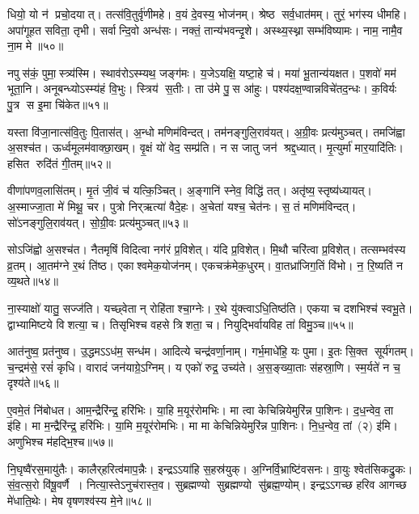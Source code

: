 धियो॒ यो न॑ प्रचो॒दयात्‌। तत्स॑वि॒तुर्वृ॑णीमहे। 
व॒यं दे॒वस्य॒ भोज॑नम्‌। श्रेष्ठ सर्व॒धात॑मम्‌। 
तुरं॒ भग॑स्य धीमहि। अपा॑गूहत सविता॒ तृभी\sn। 
सर्वान्दि॒वो अन्ध॑सः। नक्तं॒ तान्य॑भवन्दृ॒शे। 
अस्थ्य॒स्थ्ना सम्भ॑विष्यामः। नाम॒ नामै॒व ना॒म मे॥५०॥


नपुस॑कं॒ पुमा॒स्त्र्य॑स्मि। स्थाव॑रोऽस्म्यथ॒ जङ्ग॑मः। 
य॒जेऽयक्षि॒ यष्टा॒हे च॑। मया॑ भू॒तान्य॑यक्षत। 
प॒शवो॑ मम॑ भूता॒नि। अनूबन्ध्योऽस्म्य॑हं वि॒भुः। 
स्त्रिय॑ स॒तीः। ता उ॑मे पु॒स आ॑हुः। 
पश्य॑दक्ष॒ण्वान्नविचे॑तद॒न्धः। क॒विर्यः पु॒त्र स इ॒मा चि॑केत॥५१॥


यस्ता वि॑जा॒नात्स॑वि॒तुः पि॒तास॑त्‌। अ॒न्धो मणिम॑विन्दत्‌। 
तम॑नङ्गुलि॒राव॑यत्‌। अ॒ग्री॒वः प्रत्य॑मुञ्चत्‌। 
तमजि॑ह्वा अ॒सश्च॑त। ऊर्ध्वमूलम॑वाक्छा॒खम्‌। 
वृ॒क्षं यो॑ वेद॒ सम्प्र॑ति। न स जातु जन॑ श्रद्द॒ध्यात्‌। 
मृ॒त्युर्मा॑ मार॒यादि॑तिः। हसित रुदि॑तं गी॒तम्‌॥५२॥


वीणा॑पणव॒लासि॑तम्‌। मृ॒तं जी॒वं च॑ यत्कि॒ञ्चित्। 
अ॒ङ्गानि॑ स्नेव॒ विद्धि॑ तत्‌। अतृ॑ष्य॒स्तृष्य॑ध्यायत्‌। 
अ॒स्माज्जा॒ता मे॑ मिथू॒ चर\snn। पुत्रो निर्‌ऋत्या॑ वैदे॒हः। 
अ॒चेता॑ यश्च॒ चेत॑नः। स॒ तं मणिम॑विन्दत्‌। 
सो॑ऽनङ्गुलि॒राव॑यत्‌। सो॒\aav{}ग्री॒वः प्रत्य॑मुञ्चत्‌॥५३॥


सोऽजि॑ह्वो अ॒सश्च॑त। नैतमृषिं विदित्वा नग॑रं प्र॒विशेत्‌। 
य॑दि प्र॒विशेत्‌। मि॒थौ चरि॑त्वा प्र॒विशेत्‌। 
तत्सम्भव॑स्य व्र॒तम्‌। आ॒तम॑ग्ने र॒थं ति॑ष्ठ। 
एकाश्वमेक॒योज॑नम्‌। एकचक्र॑मेक॒धुरम्‌। 
वा॒तध्रा॑जिग॒तिं वि॑भो। न॒ रि॒ष्यति॑ न व्य॒थते॥५४॥


ना॒स्याक्षो॑ यातु॒ सज्ज॑ति। यच्छ्वेतान्‌ रोहि॑ताश्चा॒ग्नेः। 
र॒थे यु॑क्त्वाऽधि॒\-तिष्ठ॑ति। एकया च दशभिश्च॑ स्वभू॒ते। 
द्वाभ्यामिष्टये विशत्या॒ च। तिसृभिश्च वहसे त्रिशता॒ च। 
नियुद्भिर्वायविह ता॑ विमु॒ञ्च॥५५॥\anuvakamend


आत॑नुष्व॒ प्रत॑नुष्व। उ॒द्धमऽऽध॑म॒ सन्ध॑म। 
आदित्ये चन्द्र॑वर्णा॒नाम्‌। गर्भ॒माधे॑हि॒ यः पुमा\sn{}। 
इ॒तः सि॒क्त सूर्य॑गतम्‌। च॒न्द्रम॑से॒ रसं॑ कृधि। 
वारादं जन॑याग्रे॒ऽग्निम्‌। य एको॑ रुद्र॒ उच्य॑ते। 
अ॒स॒ङ्ख्या॒ताः स॑हस्रा॒णि। स्म॒र्यते॑ न च॒ दृश्य॑ते॥५६॥


ए॒वमे॒तं नि॑बोधत। आम॒न्द्रैरि॑न्द्र॒ हरि॑भिः। 
या॒हि म॒यूर॑रोमभिः। मा त्वा केचिन्नियेमुरि॑न्न पा॒शिनः। 
द॒ध॒न्वेव॒ ता इ॑हि। मा म॒न्द्रैरि॑न्द्र॒ हरि॑भिः। 
या॒मि म॒यूर॑रोमभिः। मा मा केचिन्नियेमुरि॑न्न पा॒शिनः। 
नि॒ध॒न्वेव॒ \mbox{तां (२)} इ॑मि। अणुभिश्च म॑हद्भि॒श्च॥५७॥


नि॒घृष्वै॑रस॒मायु॑तैः। कालैर्‌हरित्व॑माप॒न्नैः। 
इन्द्रऽऽया॑हि स॒हस्र॑युक्‌। अ॒ग्निर्वि॒भ्राष्टि॑वसनः। 
वा॒युः श्वेत॑सिकद्रु॒कः। सं॒व॒त्स॒रो वि॑षू॒वर्णै। 
नित्या॒स्तेऽनुच॑रास्त॒व। सुब्रह्मण्यो सुब्रह्मण्यो सु॑ब्रह्म॒ण्योम्‌। 
इन्द्रऽऽगच्छ हरिव आगच्छ मे॑धाति॒थेः। मेष वृषणश्व॑स्य मे॒ने॥५८॥


